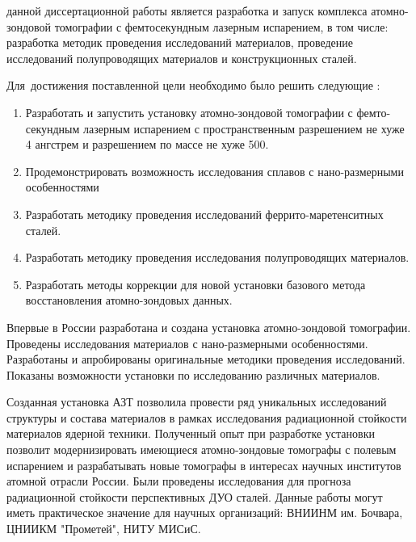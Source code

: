 {\aim} данной диссертационной работы является разработка и запуск комплекса атомно-зондовой томографии с фемтосекундным лазерным испарением, в том числе: разработка методик проведения исследований материалов, проведение исследований полупроводящих материалов и конструкционных сталей.%

Для~достижения поставленной цели необходимо было решить следующие {\tasks}:
\begin{enumerate}[beginpenalty=10000] %
  \item Разработать и запустить установку атомно-зондовой томографии с фемто-секундным лазерным испарением с пространственным разрешением не хуже 4 ангстрем и разрешением по массе не хуже 500.
  \item Продемонстрировать возможность исследования сплавов с нано-размерными особенностями
  \item Разработать методику проведения исследований феррито-маретенситных сталей.
  \item Разработать методику проведения исследования полупроводящих материалов.
  \item Разработать методы коррекции для новой установки базового метода восстановления атомно-зондовых данных.  
\end{enumerate}


{\novelty}
Впервые в России разработана и создана установка атомно-зондовой томографии. Проведены исследования материалов с нано-размерными особенностями. Разработаны и апробированы оригинальные методики проведения исследований. Показаны возможности установки по исследованию различных материалов.

{\influence} Созданная установка АЗТ позволила провести ряд уникальных исследований структуры и состава материалов в рамках исследования радиационной стойкости материалов ядерной техники. Полученный опыт при разработке установки позволит модернизировать имеющиеся атомно-зондовые томографы с полевым испарением и разрабатывать новые томографы в интересах научных институтов атомной отрасли России. Были проведены исследования для прогноза радиационной стойкости перспективных ДУО сталей. Данные работы могут иметь практическое значение для научных организаций: ВНИИНМ им. Бочвара, ЦНИИКМ "Прометей", НИТУ МИСиС.

